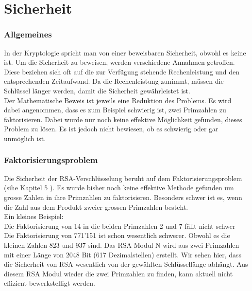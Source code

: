 \part{Sicherheit}
\section{Allgemeines}
In der Kryptologie spricht man von einer beweisbaren Sicherheit, obwohl es keine ist. Um die Sicherheit zu beweisen, werden verschiedene Annahmen getroffen. Diese beziehen sich oft auf die zur Verfügung stehende Rechenleistung und den entsprechenden Zeitaufwand. Da die Rechenleistung zunimmt, müssen die Schlüssel länger werden, damit die Sicherheit gewährleistet ist. \\
Der Mathematische Beweis ist jeweils eine Reduktion des Problems. Es wird dabei angenommen, dass es  zum Beispiel schwierig ist, zwei Primzahlen zu faktorisieren. Dabei wurde nur noch keine effektive Möglichkeit gefunden, dieses Problem zu lösen. Es ist jedoch nicht bewiesen, ob es schwierig oder gar unmöglich ist.
%
\section{Faktorisierungsproblem}
Die Sicherheit der RSA-Verschlüsselung beruht auf dem Faktorisierungsproblem (sihe Kapitel 5 \cite{rsa_and_public_key}). Es wurde bisher noch keine effektive Methode gefunden um grosse Zahlen in ihre Primzahlen zu faktorisieren. Besonders schwer ist es, wenn die Zahl aus dem Produkt zweier grossen Primzahlen besteht. \\
Ein kleines Beispiel:\\
Die Faktorisierung von 14 in die beiden Primzahlen 2 und 7 fällt nicht schwer\\
Die Faktorisierung von 771'151 ist schon wesentlich schwerer. Obwohl es die kleinen Zahlen 823 und 937 sind. Das RSA-Modul N wird aus zwei Primzahlen mit einer Länge von 2048 Bit (617 Dezimalstellen) erstellt. Wir sehen hier, dass die Sicherheit von RSA wesentlich von der gewählten Schlüssellänge abhängt. Aus diesem RSA Modul wieder die zwei Primzahlen zu finden, kann aktuell nicht effizient bewerkstelligt werden.
%
